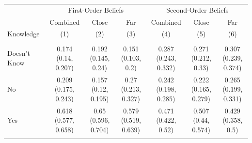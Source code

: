 
\centering

\centering
\begin{tabular}[t]{lcccccc}
\toprule
\multicolumn{1}{c}{ } & \multicolumn{3}{c}{First-Order Beliefs} & \multicolumn{3}{c}{Second-Order Beliefs} \\
\cmidrule(l{3pt}r{3pt}){2-4} \cmidrule(l{3pt}r{3pt}){5-7}
\multicolumn{1}{c}{ } & \multicolumn{1}{c}{Combined} & \multicolumn{1}{c}{Close} & \multicolumn{1}{c}{Far} & \multicolumn{1}{c}{Combined} & \multicolumn{1}{c}{Close} & \multicolumn{1}{c}{Far} \\
Knowledge & (1) & (2) & (3) & (4) & (5) & (6)\\
\midrule
\addlinespace[0.3em]
\hline
\multicolumn{7}{l}{\textbf{Bracelet}}\\
\hline
\hspace{1em}Doesn't Know & \makecell[c]{0.174\\(0.14, 0.207)} & \makecell[c]{0.192\\(0.145, 0.24)} & \makecell[c]{0.151\\(0.103, 0.2)} & \makecell[c]{0.287\\(0.243, 0.332)} & \makecell[c]{0.271\\(0.212, 0.33)} & \makecell[c]{0.307\\(0.239, 0.374)}\\
\hspace{1em}No & \makecell[c]{0.209\\(0.175, 0.243)} & \makecell[c]{0.157\\(0.12, 0.195)} & \makecell[c]{0.27\\(0.213, 0.327)} & \makecell[c]{0.242\\(0.198, 0.285)} & \makecell[c]{0.222\\(0.165, 0.279)} & \makecell[c]{0.265\\(0.199, 0.331)}\\
\hspace{1em}Yes & \makecell[c]{0.618\\(0.577, 0.658)} & \makecell[c]{0.65\\(0.596, 0.704)} & \makecell[c]{0.579\\(0.519, 0.639)} & \makecell[c]{0.471\\(0.422, 0.52)} & \makecell[c]{0.507\\(0.44, 0.574)} & \makecell[c]{0.429\\(0.358, 0.5)}\\
\addlinespace[0.3em]
\hline
\multicolumn{7}{l}{\textbf{Calendar}}\\
\hline

\end{tabular}
